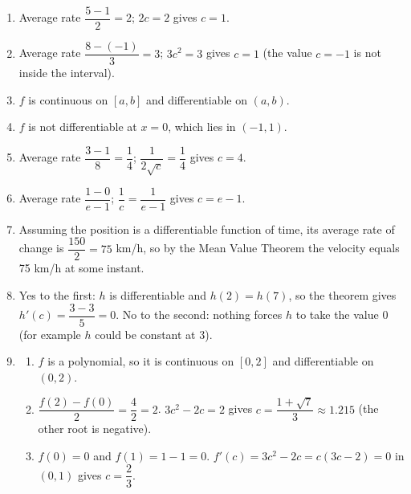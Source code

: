 \documentclass[11pt]{article}
\begin{document}
\newpage
\begin{solbox}
\begin{enumerate}[leftmargin=*,itemsep=4pt]
  \item Average rate $\dfrac{5-1}{2}=2$; $2c=2$ gives $c=1$.
  \item Average rate $\dfrac{8-(-1)}{3}=3$; $3c^2=3$ gives $c=1$ (the value $c=-1$ is not inside the interval).
  \item $f$ is continuous on $[a,b]$ and differentiable on $(a,b)$.
  \item $f$ is not differentiable at $x=0$, which lies in $(-1,1)$.
  \item Average rate $\dfrac{3-1}{8}=\dfrac14$; $\dfrac{1}{2\sqrt c}=\dfrac14$ gives $c=4$.
  \item Average rate $\dfrac{1-0}{e-1}$; $\dfrac1c=\dfrac{1}{e-1}$ gives $c=e-1$.
  \item Assuming the position is a differentiable function of time, its average rate of change is $\dfrac{150}{2}=75$ km/h, so by the Mean Value Theorem the velocity equals 75 km/h at some instant.
  \item Yes to the first: $h$ is differentiable and $h(2)=h(7)$, so the theorem gives $h'(c)=\dfrac{3-3}{5}=0$. No to the second: nothing forces $h$ to take the value 0 (for example $h$ could be constant at 3).
  \item \begin{enumerate}[label=(\alph*),leftmargin=*,itemsep=3pt]
    \item $f$ is a polynomial, so it is continuous on $[0,2]$ and differentiable on $(0,2)$.
    \item $\dfrac{f(2)-f(0)}{2}=\dfrac{4}{2}=2$. $3c^2-2c=2$ gives $c=\dfrac{1+\sqrt7}{3}\approx1.215$ (the other root is negative).
    \item $f(0)=0$ and $f(1)=1-1=0$. $f'(c)=3c^2-2c=c(3c-2)=0$ in $(0,1)$ gives $c=\dfrac23$.
  \end{enumerate}
\end{enumerate}
\end{solbox}
\end{document}

